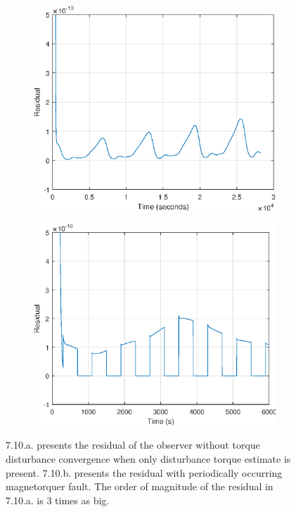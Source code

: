 
\begin{figure}[H]
	\begin{subfigure}{0.5\linewidth}
	\centering
	\includegraphics[width=1\linewidth]{figures/constdistonly_res}
	\label{fig:residualdist}	
	\caption{}
	\end{subfigure}
	\begin{subfigure}{0.5\linewidth}
	\centering
	\includegraphics[width=1\linewidth]{figures/mt_fault_res}
	\label{fig:residualmt}
	\caption{}
	\end{subfigure}
\caption{7.10.a. presents the residual of the observer without torque disturbance convergence when only disturbance torque estimate is present. 7.10.b. presents the residual with periodically occurring magnetorquer fault. The order of magnitude of the residual in 7.10.a. is 3 times as big.}
\end{figure}

